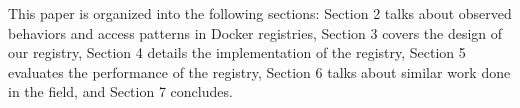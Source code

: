 This paper is organized into the following sections: Section 2 talks about observed behaviors and access patterns in Docker registries, Section 3 covers the design of our registry, Section 4 details the implementation of the registry, Section 5 evaluates the performance of the registry, Section 6 talks about similar work done in the field, and Section 7 concludes. 

  
% 
